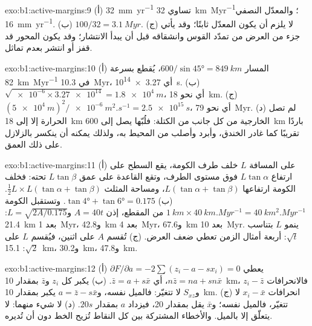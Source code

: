 \begin{solution}{exo:b1:active-margins:9}
(أ) \qty{32}{mm.yr^{-1}} تساوي \qty{32}{km.Myr^{-1}}؛ والمعدّل النصفي \qty{16}{mm.yr^{-1}}. (ب) $100/32 = \qty{3.1}{Myr}$. (ج) لا يلزم أن يكون المعدّل ثابتًا؛ وقد يأتي جزء من العرض من تمدّد القوس وانشقاقه قبل أن يبدأ الانتشار؛ وقد يكون المحور قد قفز أو انتشر بعدم تماثل.
\end{solution}

\begin{solution}{exo:b1:active-margins:10}
(أ) المسار $600/\sin\ang{45} = \qty{849}{km}$، يُقطع بسرعة \qty{82}{km.Myr^{-1}} في \qty{10.3}{Myr}، أي \qty{3.27e14}{s}. (ب) $\sqrt{\num{e-6}\times\num{3.27e14}} = \qty{1.8e4}{m}$، أي نحو \qty{18}{km}. (ج) $(\qty{5e4}{m})^2/\qty{e-6}{m^2.s^{-1}} = \qty{2.5e15}{s}$، أي نحو \qty{79}{Myr}. (د) لم تصل الحرارة إلا إلى \qty{18}{km} الخارجية من كل جانب من الكتلة: فلُبّها يصل إلى \qty{600}{km} باردًا تقريبًا كما غادر الخندق، وأبرد وأصلب من  المحيط به، ولذلك يمكنه أن ينكسر بالزلازل على ذلك العمق.
\end{solution}

\begin{solution}{exo:b1:active-margins:11}
(أ) على المسافة $L$ خلف طرف الكومة، يقع السطح على ارتفاع $L\tan\alpha$ فوق مستوى الطرف، وتقع القاعدة على عمق $L\tan\beta$ تحته: فخلف الكومة ارتفاعها $L(\tan\alpha + \tan\beta)$، ومساحة المثلث $\frac12 L\times L(\tan\alpha + \tan\beta)$. (ب) $\tan\ang{4} + \tan\ang{6} =
0.175$. وتستقبل الكومة $\qty{1}{km}\times\qty{40}{km.Myr^{-1}} =
\qty{40}{km^2.Myr^{-1}}$ من المقطع، إذن $A = 40t$ و$L = \sqrt{2A/0.175}$: \qty{21.4}{km} بعد \qty{1}{Myr}، و\qty{42.8}{km}
بعد \qty{4}{Myr}، و\qty{67.6}{km} بعد \qty{10}{Myr}. ينمو $L$ بتناسب $\sqrt t$: أربعة أمثال الزمن تعطي ضعف العرض. (ج) تُقسم $A$ على اثنين، فيُقسم $L$ على $\sqrt2$: \qty{15.1}{km}، و\qty{30.2}{km}، و\qty{47.8}{km}.
\end{solution}

\begin{solution}{exo:b1:active-margins:12}
(أ) $\partial F/\partial a = -2\sum(z_i - a - s x_i) = 0$ يعطي
$n\bar z = na + sn\bar x$، أي $\bar z = a + s\bar x$. (ب) يكبر كل $z_i$ و$\bar z$ بمقدار \qty{10}{km}، فالانحرافات $z_i - \bar z$ و$S_{xz}$ لا تتغيّر: فالميل نفسه، و$a = \bar z - s\bar x$ يكبر بمقدار \qty{10}{km}. (ج) انحرافات $x_i - \bar x$ لا تتغيّر، فالميل نفسه؛ و$\bar x$ يقل بمقدار 20، فيزداد $a$ بمقدار $20s$. (د) لا شيء منهما:  لا يتعلّق إلا بالميل. والأخطاء المشتركة بين كل النقاط تُزيح الخط دون أن تُديره.
\end{solution}

